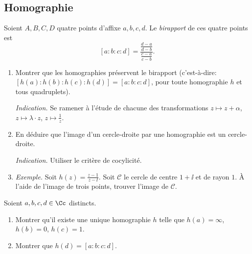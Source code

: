 \documentclass[11pt,class=report,crop=false]{standalone}
\begin{document}
\subsection{Homographie}

\begin{exercicecours}

Soient $A, B, C, D$ quatre points d'affixe $a,b,c,d$.
Le \emph{birapport} de ces quatre points est 
$$[a:b:c:d] = \frac{\frac{d-a}{d-b}}{\frac{c-a}{c-b}}.$$

\begin{enumerate}
 \item Montrer que les homographies préservent le birapport (c'est-à-dire:
 $[h(a):h(b):h(c):h(d)]=[a:b:c:d]$, pour toute homographie $h$ et tous quadruplets).
 
 \emph{Indication.} Se ramener à l'étude de chacune des transformations $z \mapsto z+\alpha$,
 $z \mapsto \lambda \cdot z$, $z \mapsto \frac{1}{z}$.
 
 \item En déduire que l'image d'un cercle-droite par une homographie est un cercle-droite.
 
  \emph{Indication.} Utiliser le critère de cocylicité.
 
 \item \emph{Exemple.} Soit $h(z) = \frac{z-1}{z-\ii}$. Soit $\mathcal{C}$
 le cercle de centre $1 + \ii$ et de rayon $1$. 
 \`A l'aide de l'image de trois points, trouver l'image de $\mathcal{C}$.
 
\end{enumerate}
\end{exercicecours}


\begin{exercicecours}
Soient $a,b,c,d \in \Cc$ distincts.
\begin{enumerate}
 \item Montrer qu'il existe une unique homographie $h$ telle que $h(a)=\infty$, $h(b)=0$,
 $h(c)=1$. 
 
 \item Montrer que $h(d) = [a:b:c:d]$.
\end{enumerate}
\end{exercicecours}
\end{document}
